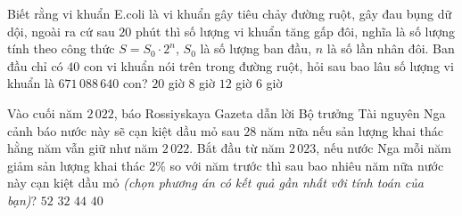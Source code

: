 

\begin{ex}%
	Biết rằng vi khuẩn E.coli là vi khuẩn gây tiêu chảy đường ruột, gây đau bụng dữ dội, ngoài ra  cứ sau $20$ phút thì số lượng vi khuẩn tăng gấp đôi, nghĩa là số lượng tính theo công thức $S=S_0\cdot2^n$, $S_0$ là số lượng ban đầu, $n$ là số lần nhân đôi. Ban đầu chỉ có $40$ con vi khuẩn nói trên trong đường ruột, hỏi sau bao lâu số lượng vi khuẩn là $671\,088\,640$ con?
	 \choice
		 {$20$ giờ}
		{\True $8$ giờ} 
		{$12$ giờ} 
		{$6$ giờ} 
\end{ex}

\begin{ex}%
	Vào cuối năm $2\,022$, báo Rossiyskaya Gazeta dẫn lời Bộ trưởng Tài nguyên Nga cảnh báo nước này sẽ cạn kiệt dầu mỏ sau $28$ năm nữa nếu sản lượng khai thác hằng năm vẫn giữ như năm $2\,022$. Bắt đầu từ năm $2\,023$, nếu nước Nga mỗi năm giảm sản lượng khai thác $2\%$ so với năm trước thì sau bao nhiêu năm nữa nước này cạn  kiệt dầu mỏ \textit{(chọn phương án có kết quả gần nhất với tính toán của bạn)}?
	 \choice
		 {$52$}
		{$32$} 
		{$44$} 
		{\True $40$} 
\end{ex}

